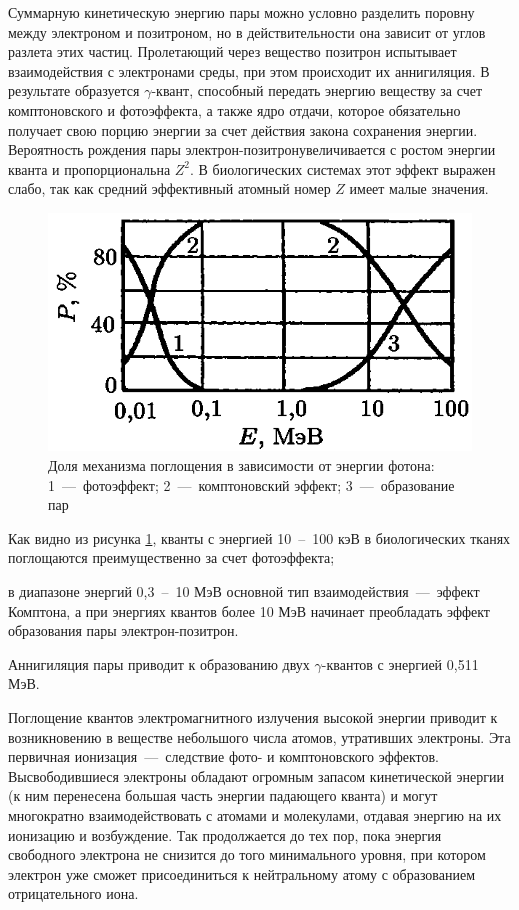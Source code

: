 \documentclass[a4paper, 14pt]{article}
\begin{document}
Суммарную кинетическую энергию пары можно условно разделить поровну между электроном и позитроном, но в действительности она зависит от углов разлета этих частиц. Пролетающий через вещество позитрон испытывает взаимодействия с электронами среды, при этом происходит их аннигиляция. В результате образуется $\gamma$-квант, способный передать энергию веществу за счет комптоновского и фотоэффекта, а также ядро отдачи, которое обязательно получает свою порцию энергии за счет действия закона сохранения энергии. Вероятность рождения пары электрон-позитронувеличивается с ростом энергии кванта и пропорциональна $Z^2$. В биологических системах этот эффект выражен слабо, так как средний эффективный атомный номер $Z$ имеет малые значения.
\begin{figure}[htbp]
    \centering
    \includegraphics[width=.5\textwidth]{adsorptionShare.png}
    \caption{Доля механизма поглощения в зависимости от энергии фотона: 1~---~фотоэффект; 2~---~комптоновский эффект; 3~---~образование пар}
    \label{adsorptionShare}
\end{figure}

Как видно из рисунка \ref{adsorptionShare}, кванты с энергией 10~--~100 кэВ в биологических тканях
поглощаются преимущественно за счет фотоэффекта;

в диапазоне энергий 0,3~--~10 МэВ основной тип взаимодействия~---~эффект
Комптона, а при энергиях квантов более 10 МэВ начинает преобладать эффект
образования пары электрон-позитрон.

Аннигиляция пары приводит к образованию двух $\gamma$-квантов с энергией 0,511
МэВ.

Поглощение квантов электромагнитного излучения высокой энергии приводит к
возникновению в веществе небольшого числа атомов, утративших электроны. Эта
первичная ионизация~---~следствие фото- и комптоновского эффектов.
Высвободившиеся электроны обладают огромным запасом кинетической энергии (к
ним перенесена большая часть энергии падающего кванта) и могут многократно
взаимодействовать с атомами и молекулами, отдавая энергию на их ионизацию и
возбуждение. Так продолжается до тех пор, пока энергия свободного электрона не
снизится до того минимального уровня, при котором электрон уже сможет
присоединиться к нейтральному атому с образованием отрицательного иона.
\end{document}
